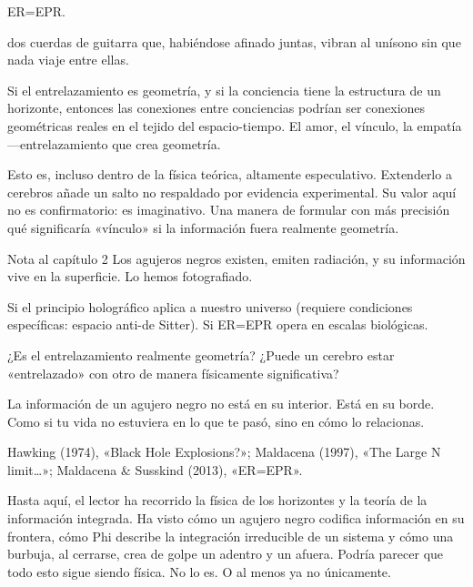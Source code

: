 \begin{fisica}
 ER=EPR.

 dos cuerdas de guitarra que, habiéndose afinado juntas, vibran al unísono sin que nada viaje entre ellas.
\end{fisica}
Si el entrelazamiento es geometría, y si la conciencia tiene la estructura de un horizonte, entonces las conexiones entre conciencias podrían ser conexiones geométricas reales en el tejido del espacio-tiempo. El amor, el vínculo, la empatía —entrelazamiento que crea geometría.

Esto es, incluso dentro de la física teórica, altamente especulativo. Extenderlo a cerebros añade un salto no respaldado por evidencia experimental. Su valor aquí no es confirmatorio: es imaginativo. Una manera de formular con más precisión qué significaría «vínculo» si la información fuera realmente geometría.

\begin{notacap}{Nota al capítulo 2}
 Los agujeros negros existen, emiten radiación, y su información vive en la superficie. Lo hemos fotografiado.

 Si el principio holográfico aplica a nuestro universo (requiere condiciones específicas: espacio anti-de Sitter). Si ER=EPR opera en escalas biológicas.

 ¿Es el entrelazamiento realmente geometría? ¿Puede un cerebro estar «entrelazado» con otro de manera físicamente significativa?

 La información de un agujero negro no está en su interior. Está en su borde. Como si tu vida no estuviera en lo que te pasó, sino en cómo lo relacionas.

 Hawking (1974), «Black Hole Explosions?»; Maldacena (1997), «The Large N limit…»; Maldacena \& Susskind (2013), «ER=EPR».
\end{notacap}
\noindent {}

Hasta aquí, el lector ha recorrido la física de los horizontes y la teoría de la información integrada. Ha visto cómo un agujero negro codifica información en su frontera, cómo Phi describe la integración irreducible de un sistema y cómo una burbuja, al cerrarse, crea de golpe un adentro y un afuera. Podría parecer que todo esto sigue siendo física. No lo es. O al menos ya no únicamente.


